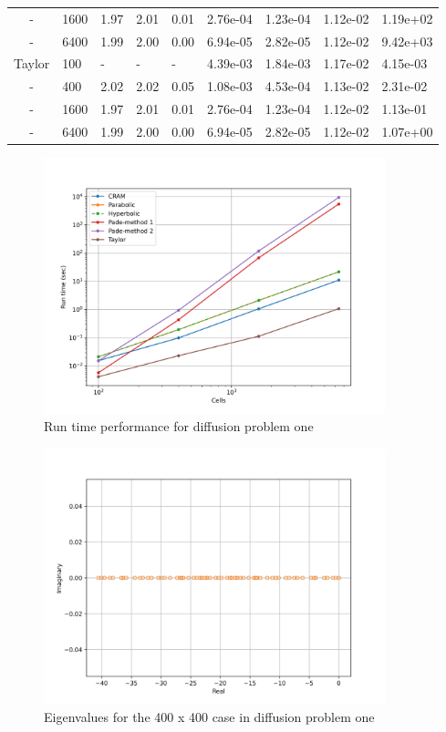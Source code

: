 \begin{table}[htbp]
{\begin{tabular}{cllllllll}
   - & 1600 & 1.97 & 2.01 & 0.01 & 2.76e-04 & 1.23e-04 & 1.12e-02 & 1.19e+02\\
   - & 6400 & 1.99 & 2.00 & 0.00 & 6.94e-05 & 2.82e-05 & 1.12e-02 & 9.42e+03\\
   \hline
   Taylor & 100 & - & - & - & 4.39e-03 & 1.84e-03 & 1.17e-02 & 4.15e-03\\
   - & 400 & 2.02 & 2.02 & 0.05 & 1.08e-03 & 4.53e-04 & 1.13e-02 & 2.31e-02\\
   - & 1600 & 1.97 & 2.01 & 0.01 & 2.76e-04 & 1.23e-04 & 1.12e-02 & 1.13e-01\\
   - & 6400 & 1.99 & 2.00 & 0.00 & 6.94e-05 & 2.82e-05 & 1.12e-02 & 1.07e+00\\
   \hline
   \end{tabular}
   }
\end{table}

\FloatBarrier
\newpage

\begin{figure}[ht]
    \centering
    \includegraphics[width=3.9in]{images/chapter-5/diffusionProblem1Runtime.png}
    \caption{Run time performance for diffusion problem one}
    \label{fig:runtime_diffusion_one}
\end{figure}

\begin{figure}[hb]
    \centering
    \includegraphics[width=3.9in]{images/chapter-5/eigenvaluesDiffusion1-20.png}
    \caption{Eigenvalues for the 400 x 400 case in diffusion problem one}
    \label{fig:eigenvalues_diffusion_one}
\end{figure}

